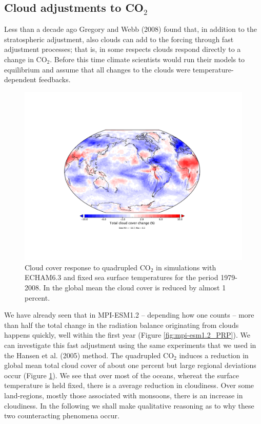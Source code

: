 \documentclass[12pt]{book}
\begin{document}
\subsection{Cloud adjustments to CO$_2$}
Less than a decade ago Gregory and Webb (2008) found that, in addition to the stratospheric adjustment, also clouds can add to the forcing through fast adjustment processes; that is, in some respects clouds respond directly to a change in CO$_2$. Before this time climate scientists would run their models to equilibrium and assume that all changes to the clouds were temperature-dependent feedbacks. 

\begin{figure}[!]
\begin{center}
\includegraphics[width=14 cm]{../external_figures/aclcov_BOT_echam-6302p4_amip4xCO2_197.pdf}
\end{center}
\caption{ Cloud cover response to quadrupled CO$_2$ in simulations with ECHAM6.3 and fixed sea surface temperatures for the period 1979-2008. In the global mean the cloud cover is reduced by almost 1 percent. } 
\label{fig:cloud_cover_adjustment}
\end{figure}

We have already seen that in MPI-ESM1.2 -- depending how one counts -- more than half the total change in the radiation balance originating from clouds happens quickly, well within the first year (Figure \ref{fig:mpi-esm1.2_PRP}). We can investigate this fast adjustment using the same experiments that we used in the  Hansen et al. (2005) method. The quadrupled CO$_2$ induces a reduction in global mean total cloud cover of about one percent but large regional deviations occur (Figure \ref{fig:cloud_cover_adjustment}). We see that over most of the oceans, whereat the surface temperature is held fixed, there is a average reduction in cloudiness. Over some land-regions, mostly those associated with monsoons, there is an increase in cloudiness. In the following we shall make qualitative reasoning as to why these two counteracting phenomena occur.
\end{document}
